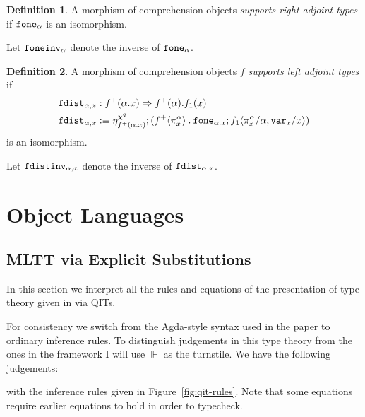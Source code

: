 \documentclass[10pt]{article}
\theoremstyle{definition}
\newtheorem{definition}{Definition}
\newcommand{\tcell}{\Rightarrow}
\newcommand{\CTX}{\,\,\mathsf{Ctx}}
\newcommand{\TYPE}{\,\,\mathsf{Type}}
\newcommand\TrPlus[2]{\ensuremath{{#1}^+(#2)}}
\newcommand\bdot[0]{\mathbin{.}}
\newcommand\ap[2]{\ensuremath{#1 \langle #2 \rangle }}
\newcommand\ApPlus[2]{\ensuremath{{#1}^+ \langle #2 \rangle }}
\begin{document}
\begin{definition}
A morphism of comprehension objects \emph{supports right adjoint types} if $\mathtt{fone}_{\alpha}$ is an isomorphism.
\end{definition}
Let $\mathtt{foneinv}_{\alpha}$ denote the inverse of $\mathtt{fone}_{\alpha}$.

\begin{definition}
A morphism of comprehension objects $f$ \emph{supports left adjoint types} if 
\begin{align*}
\fdist{\alpha, x} &: \TrPlus{f}{\alpha.x} \tcell \TrPlus{f}{\alpha}.f_1(x) \\
\fdist{\alpha, x} &:\equiv \eta^{\chi^q}_{\TrPlus{f}{\alpha.x}} ; (\ApPlus{f}{\pi^\alpha_x} \bdot \fone{\alpha.x};\ap{f_1}{\pi^\alpha_x/\alpha, \var{x}/x})
\end{align*}
is an isomorphism.
\end{definition}
Let $\mathtt{fdistinv}_{\alpha,x}$ denote the inverse of $\mathtt{fdist}_{\alpha,x}$.

\section{Object Languages}

\subsection{MLTT via Explicit Substitutions}
\newcommand{\qyields}{\Vdash} \newcommand{\varsof}[1]{{#1}^\dagger}
\newcommand{\upstairs}[1]{\overline{#1}}
\newcommand{\downstairs}[1]{\underline{#1}}
\newcommand{\asdep}[1]{{#1}_p}
\newcommand\proj[1]{\ensuremath{\mathsf{proj}_{#1}}}
\newcommand\qvar[1]{\ensuremath{\mathsf{var}_{#1}}}
\newcommand\outof[1]{\ensuremath{\mathsf{outof}_{#1}}}
\newcommand\into[1]{\ensuremath{\mathsf{into}_{#1}}}

In this section we interpret all the rules and equations of the presentation of type theory given in \cite{altenkirchkaposi16qit} via QITs. 

For consistency we switch from the Agda-style syntax used in the paper to ordinary inference rules. To distinguish judgements in this type theory from the ones in the framework I will use $\qyields$ as the turnstile.  We have the following judgements:
with the inference rules given in Figure~\ref{fig:qit-rules}. Note that some equations require earlier equations to hold in order to typecheck.
\end{document}
